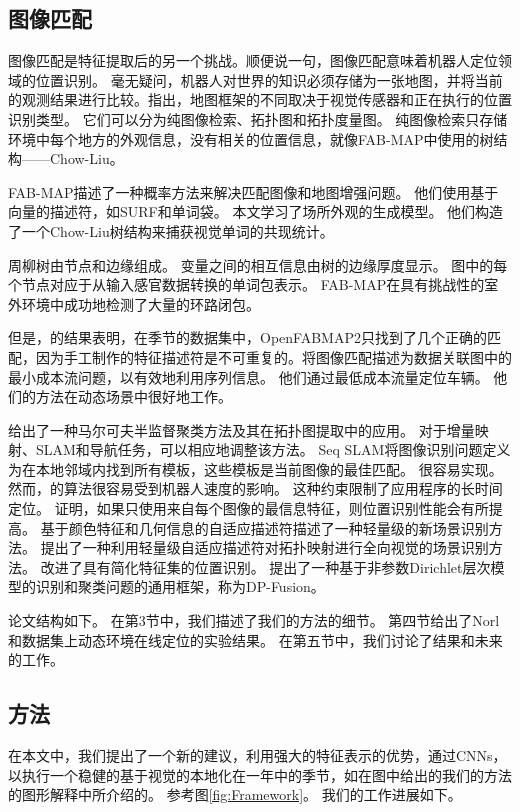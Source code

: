 \subsection{图像匹配}
 图像匹配是特征提取后的另一个挑战。顺便说一句，图像匹配意味着机器人定位领域的位置识别。 毫无疑问，机器人对世界的知识必须存储为一张地图，并将当前的观测结果进行比较。\cite{lowry2016visual}指出，地图框架的不同取决于视觉传感器和正在执行的位置识别类型。 它们可以分为纯图像检索、拓扑图和拓扑度量图。 纯图像检索只存储环境中每个地方的外观信息，没有相关的位置信息，就像FAB-MAP\cite{cummins2008fab}中使用的树结构——Chow-Liu。
 
FAB-MAP\cite{cummins2008fab}描述了一种概率方法来解决匹配图像和地图增强问题。 他们使用基于向量的描述符，如SURF和单词袋。 本文学习了场所外观的生成模型。 他们构造了一个Chow-Liu树结构\cite{chow1968近似}来捕获视觉单词的共现统计。 

 周柳树由节点和边缘组成。 变量之间的相互信息由树的边缘厚度显示。 图中的每个节点对应于从输入感官数据转换的单词包表示。 FAB-MAP在具有挑战性的室外环境中成功地检测了大量的环路闭包。 

 但是，\cite{naseer2014robust}的结果表明，在季节的数据集中，OpenFABMAP2只找到了几个正确的匹配，因为手工制作的特征描述符是不可重复的。\cite{naseer2014robust}将图像匹配描述为数据关联图中的最小成本流问题，以有效地利用序列信息。 他们通过最低成本流量定位车辆。 他们的方法在动态场景中很好地工作。 

\cite{liu2012markov}给出了一种马尔可夫半监督聚类方法及其在拓扑图提取中的应用。 对于增量映射、SLAM和导航任务，可以相应地调整该方法。
Seq SLAM\cite{milford2012seqslam}将图像识别问题定义为在本地邻域内找到所有模板，这些模板是当前图像的最佳匹配。 很容易实现。 然而，\cite{milford2012seqslam}的算法很容易受到机器人速度的影响。 这种约束限制了应用程序的长时间定位。 \cite{Schindler2007City}证明，如果只使用来自每个图像的最信息特征，则位置识别性能会有所提高。 基于颜色特征和几何信息的自适应描述符描述了一种轻量级的新场景识别方法。 \cite{liu2009scene}提出了一种利用轻量级自适应描述符对拓扑映射进行全向视觉的场景识别方法。 \cite{li2006probabilistic}改进了具有简化特征集的位置识别。 \cite{liu2012dp}提出了一种基于非参数Dirichlet层次模型的识别和聚类问题的通用框架，称为DP-Fusion。

论文结构如下。 在第3节中，我们描述了我们的方法的细节。 第四节给出了Norl和数据集上动态环境在线定位的实验结果。 在第五节中，我们讨论了结果和未来的工作。

\subsection{方法}
在本文中，我们提出了一个新的建议，利用强大的特征表示的优势，通过CNNs，以执行一个稳健的基于视觉的本地化在一年中的季节，如在图中给出的我们的方法的图形解释中所介绍的。 参考图\ref{fig:Framework}。 我们的工作进展如下。 

